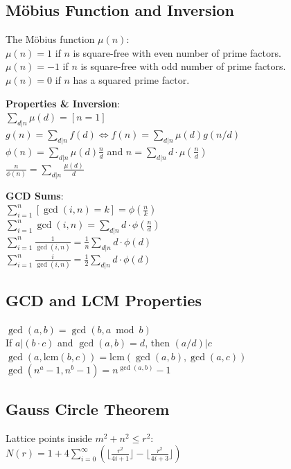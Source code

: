\subsection{Möbius Function and Inversion}
The Möbius function $\mu(n)$: \\
\textbullet{} $\mu(n) = 1$ if $n$ is square-free with even number of prime factors. \\
\textbullet{} $\mu(n) = -1$ if $n$ is square-free with odd number of prime factors. \\
\textbullet{} $\mu(n) = 0$ if $n$ has a squared prime factor.

\textbf{Properties \& Inversion}: \\
\textbullet{} $\sum_{d|n} \mu(d) = [n = 1]$ \\
\textbullet{} $g(n) = \sum_{d|n} f(d) \iff f(n) = \sum_{d|n} \mu(d)g(n/d)$ \\
\textbullet{} $\phi(n) = \sum_{d|n} \mu(d) \frac{n}{d}$ and $n = \sum_{d|n} d \cdot \mu\left(\frac{n}{d}\right)$ \\
\textbullet{} $\frac{n}{\phi(n)} = \sum_{d|n} \frac{\mu(d)}{d}$

\textbf{GCD Sums}: \\
\textbullet{} $\sum_{i=1}^n [\gcd(i, n) = k] = \phi\left(\frac{n}{k}\right)$ \\
\textbullet{} $\sum_{i=1}^n \gcd(i, n) = \sum_{d|n} d \cdot \phi\left(\frac{n}{d}\right)$ \\
\textbullet{} $\sum_{i=1}^n \frac{1}{\gcd(i,n)} = \frac{1}{n} \sum_{d|n} d \cdot \phi(d)$ \\
\textbullet{} $\sum_{i=1}^n \frac{i}{\gcd(i,n)} = \frac{1}{2} \sum_{d|n} d \cdot \phi(d)$

\subsection{GCD and LCM Properties}
\textbullet{} $\gcd(a, b) = \gcd(b, a \bmod b)$ \\
\textbullet{} If $a | (b \cdot c)$ and $\gcd(a, b) = d$, then $(a/d) | c$ \\
\textbullet{} $\gcd(a, \text{lcm}(b,c)) = \text{lcm}(\gcd(a,b), \gcd(a,c))$ \\
\textbullet{} $\gcd(n^a - 1, n^b - 1) = n^{\gcd(a,b)} - 1$

\subsection{Gauss Circle Theorem}
Lattice points inside $m^2 + n^2 \le r^2$: \\
$N(r) = 1 + 4 \sum_{i=0}^\infty \left( \lfloor \frac{r^2}{4i+1} \rfloor - \lfloor \frac{r^2}{4i+3} \rfloor \right)$
